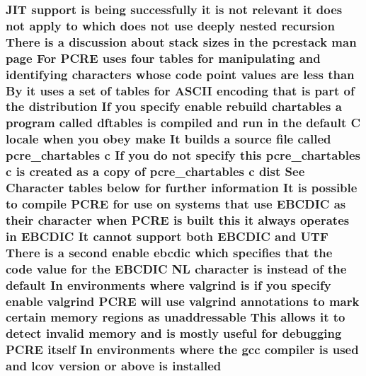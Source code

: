 \subsubsection[{\texorpdfstring{installed}{installed}}]{ J\+IT {\bf support} {\bf is} being successfully {\bf it} {\bf is} {\bf not} relevant {\bf it} does {\bf not} apply {\bf to} {\bf which} does {\bf not} use deeply nested {\bf recursion} There {\bf is} {\bf a} discussion about {\bf stack} sizes {\bf in} the pcrestack {\bf man} page For {\bf P\+C\+RE} uses four {\bf tables} for manipulating and identifying {\bf characters} whose {\bf code} {\bf point} {\bf values} {\bf are} less {\bf than} By {\bf it} uses {\bf a} {\bf set} {\bf of} {\bf tables} for {\bf A\+S\+C\+II} {\bf encoding} that {\bf is} part {\bf of} the distribution If you specify enable rebuild {\bf chartables} {\bf a} {\bf program} called {\bf dftables} {\bf is} {\bf compiled} and {\bf run} {\bf in} the {\bf default} {\bf C} {\bf locale} when you obey {\bf make} It builds {\bf a} {\bf source} {\bf file} called pcre\+\_\+chartables {\bf c} If you {\bf do} {\bf not} specify {\bf this} pcre\+\_\+chartables {\bf c} {\bf is} created {\bf as} {\bf a} copy {\bf of} pcre\+\_\+chartables {\bf c} {\bf dist} See Character {\bf tables} {\bf below} for further information It {\bf is} {\bf possible} {\bf to} {\bf compile} {\bf P\+C\+RE} for use {\bf on} {\bf systems} that use E\+B\+C\+D\+IC {\bf as} their {\bf character} when {\bf P\+C\+RE} {\bf is} {\bf built} {\bf this} {\bf it} always operates {\bf in} E\+B\+C\+D\+IC It cannot {\bf support} both E\+B\+C\+D\+IC and U\+TF There {\bf is} {\bf a} {\bf second} enable ebcdic {\bf which} specifies that the {\bf code} {\bf value} for the E\+B\+C\+D\+IC {\bf NL} {\bf character} {\bf is} instead {\bf of} the {\bf default} In {\bf environments} {\bf where} valgrind {\bf is} {\bf if} you specify enable valgrind {\bf P\+C\+RE} will use valgrind annotations {\bf to} {\bf mark} certain {\bf memory} regions {\bf as} unaddressable This allows {\bf it} {\bf to} detect invalid {\bf memory} and {\bf is} mostly useful for debugging {\bf P\+C\+RE} {\bf itself} In {\bf environments} {\bf where} the {\bf gcc} {\bf compiler} {\bf is} {\bf used} and lcov version {\bf or} {\bf above} {\bf is} installed}\hypertarget{README_8txt_abf5a4a7b9414b8b9683ee861c8a64879}{}\label{README_8txt_abf5a4a7b9414b8b9683ee861c8a64879}
